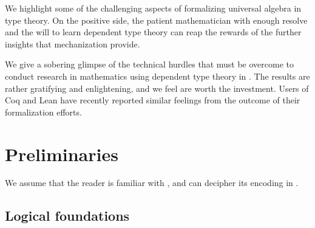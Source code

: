 We highlight some of the challenging aspects of formalizing universal algebra in type theory.
On the positive side, the patient mathematician with enough resolve and the will to learn
dependent type theory can reap the rewards of the further insights that mechanization provide.

\ifshort\else
We give a sobering glimpse of the technical hurdles that must be overcome
to conduct research in mathematics using dependent type theory in \agda.
The results are rather gratifying and enlightening, and we feel are worth
the investment. Users of Coq and Lean have recently reported similar feelings
from the outcome of their formalization efforts.
\fi

\section{Preliminaries}

We assume that the reader is familiar with \mltt, and can decipher its encoding in \agda.

\subsection{Logical foundations}

